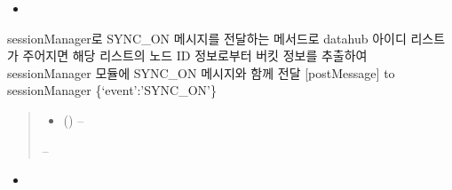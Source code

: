 \documentclass[a4paper,10pt,english]{sphinxmanual}
\begin{document}
\begin{fulllineitems}
\begin{fulllineitems}
\nopagebreak

\begin{itemize}
\item {} 
\sphinxAtStartPar
{\hyperref[\detokenize{_SessionManager:SessionManager._dmGetSessionListInfo}]{}}

\end{itemize}



\end{fulllineitems}


\begin{fulllineitems}
\label{\detokenize{_DHDaemon:DHDaemon._smSyncOn}}
\pysigstartsignatures
{}
\pysigstopsignatures
\sphinxAtStartPar
sessionManager로 SYNC\_ON 메시지를 전달하는 메서드로
datahub 아이디 리스트가 주어지면 해당 리스트의 노드 ID 정보로부터 버킷 정보를 추출하여
sessionManager 모듈에 SYNC\_ON 메시지와 함께 전달
{[}postMessage{]} to sessionManager \{‘event’:’SYNC\_ON’\}
\begin{quote}\begin{description}
\begin{itemize}
\item {} 
\sphinxAtStartPar
{} () – 

\end{itemize}

\sphinxAtStartPar
{} –

\end{description}\end{quote}


\nopagebreak

\begin{itemize}
\item {} 
\sphinxAtStartPar
{\hyperref[\detokenize{_SessionManager:SessionManager._dhDaemonListener}]{}}

\end{itemize}




\end{fulllineitems}
\end{fulllineitems}
\end{document}
